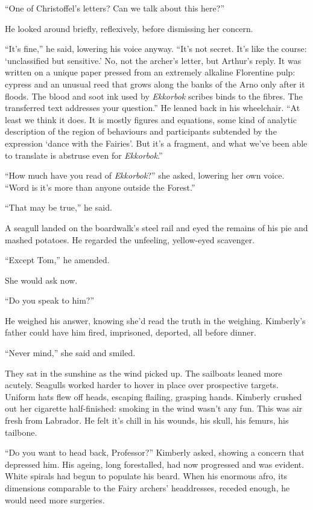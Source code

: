 \documentclass[11pt,a5paper]{article}
\begin{document}
``One of Christoffel's letters? Can we talk about this here?''

He looked around briefly, reflexively, before dismissing her concern.

``It's fine,'' he said, lowering his voice anyway. ``It's not secret. It's like the course: `unclassified but sensitive.' No, not the archer's letter, but Arthur's reply. It was written on a unique paper pressed from an extremely alkaline Florentine pulp: cypress and an unusual reed that grows along the banks of the Arno only after it floods. The blood and soot ink used by \emph{Ekkorbok} scribes binds to the fibres. The transferred text addresses your question.'' He leaned back in his wheelchair. ``At least we think it does. It is mostly figures and equations, some kind of analytic description of the region of behaviours and participants subtended by the expression `dance with the Fairies'. But it's a fragment, and what we've been able to translate is abstruse even for \emph{Ekkorbok}.''

``How much have you read of \emph{Ekkorbok}?'' she asked, lowering her own voice. ``Word is it's more than anyone outside the Forest.''

``That may be true,'' he said.

A seagull landed on the boardwalk's steel rail and eyed the remains of his pie and mashed potatoes. He regarded the unfeeling, yellow-eyed scavenger.

``Except Tom,'' he amended.

She would ask now.

``Do you speak to him?''

He weighed his answer, knowing she'd read the truth in the weighing. Kimberly's father could have him fired, imprisoned, deported, all before dinner.

``Never mind,'' she said and smiled.

They sat in the sunshine as the wind picked up. The sailboats leaned more acutely. Seagulls worked harder to hover in place over prospective targets. Uniform hats flew off heads, escaping flailing, grasping hands. Kimberly crushed out her cigarette half-finished: smoking in the wind wasn't any fun. This was air fresh from Labrador. He felt it's chill in his wounds, his skull, his femurs, his tailbone.

``Do you want to head back, Professor?'' Kimberly asked, showing a concern that depressed him. His ageing, long forestalled, had now progressed and was evident. White spirals had begun to populate his beard. When his enormous afro, its dimensions comparable to the Fairy archers' headdresses, receded enough, he would need more surgeries.
\end{document}
